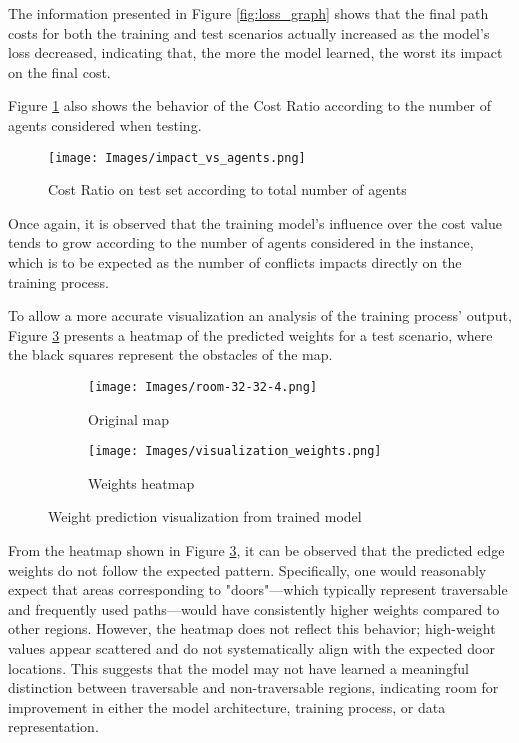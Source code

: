 The information presented in Figure \ref{fig:loss_graph} shows that the final path costs for both the training and test scenarios actually increased as the model's loss decreased, indicating that, the more the model learned, the worst its impact on the final cost.

Figure \ref{fig:graphic_map} also shows the behavior of the Cost Ratio according to the number of agents
considered when testing.

\begin{figure}[!ht]
    \centering
    \texttt{[image: Images/impact\_vs\_agents.png]}
    \caption{Cost Ratio on test set according to total number of agents}
    \label{fig:graphic_map}
\end{figure}

Once again, it is observed that the training model's influence over the cost value tends to grow according to the number of agents considered in the instance, which is to be expected as the number of conflicts impacts directly on the training process.

To allow a more accurate visualization an analysis of the training process' output, Figure \ref{fig:heatmap} presents a heatmap of the predicted weights for a test scenario, where the black squares represent the obstacles of the map.

\begin{figure}[!ht]
    \begin{subfigure}[b]{0.5\textwidth}
        \texttt{[image: Images/room-32-32-4.png]}
        \caption{Original map}
        \label{fig:original_map}
    \end{subfigure}
    \hspace{0.01\textwidth}
    \begin{subfigure}[b]{0.5\textwidth}
        \texttt{[image: Images/visualization\_weights.png]}
        \caption{Weights heatmap}
        \label{fig:heatmap}
    \end{subfigure}
    \vfill
    \caption{Weight prediction visualization from trained model}
    \label{fig:weight_pred}
\end{figure}

From the heatmap shown in Figure \ref{fig:heatmap}, it can be observed that the predicted edge weights do not follow the expected pattern. Specifically, one would reasonably expect that areas corresponding to "doors"—which typically represent traversable and frequently used paths—would have consistently higher weights compared to other regions. However, the heatmap does not reflect this behavior; high-weight values appear scattered and do not systematically align with the expected door locations. This suggests that the model may not have learned a meaningful distinction between traversable and non-traversable regions, indicating room for improvement in either the model architecture, training process, or data representation.